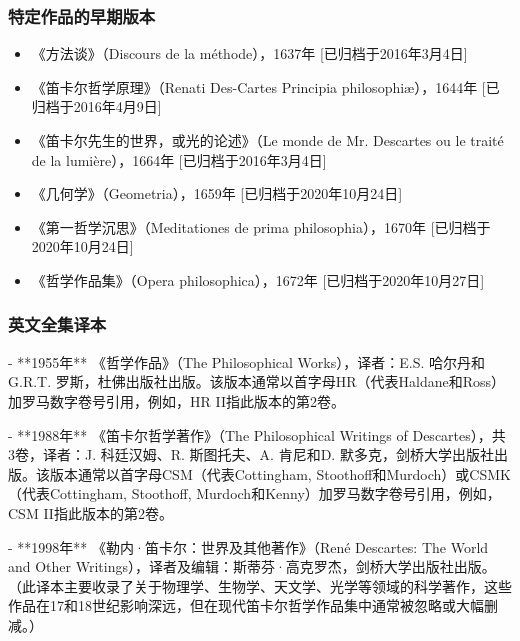\subsubsection{特定作品的早期版本}
\begin{itemize}
\item 《方法谈》（Discours de la méthode），1637年 [已归档于2016年3月4日]
\item 《笛卡尔哲学原理》（Renati Des-Cartes Principia philosophiæ），1644年 [已归档于2016年4月9日]
\item 《笛卡尔先生的世界，或光的论述》（Le monde de Mr. Descartes ou le traité de la lumière），1664年 [已归档于2016年3月4日]
\item 《几何学》（Geometria），1659年 [已归档于2020年10月24日]
\item 《第一哲学沉思》（Meditationes de prima philosophia），1670年 [已归档于2020年10月24日]
\item 《哲学作品集》（Opera philosophica），1672年 [已归档于2020年10月27日]
\end{itemize}
\subsubsection{英文全集译本}

- **1955年** 《哲学作品》（The Philosophical Works），译者：E.S. 哈尔丹和G.R.T. 罗斯，杜佛出版社出版。该版本通常以首字母HR（代表Haldane和Ross）加罗马数字卷号引用，例如，HR II指此版本的第2卷。

- **1988年** 《笛卡尔哲学著作》（The Philosophical Writings of Descartes），共3卷，译者：J. 科廷汉姆、R. 斯图托夫、A. 肯尼和D. 默多克，剑桥大学出版社出版。该版本通常以首字母CSM（代表Cottingham, Stoothoff和Murdoch）或CSMK（代表Cottingham, Stoothoff, Murdoch和Kenny）加罗马数字卷号引用，例如，CSM II指此版本的第2卷。

- **1998年** 《勒内·笛卡尔：世界及其他著作》（René Descartes: The World and Other Writings），译者及编辑：斯蒂芬·高克罗杰，剑桥大学出版社出版。（此译本主要收录了关于物理学、生物学、天文学、光学等领域的科学著作，这些作品在17和18世纪影响深远，但在现代笛卡尔哲学作品集中通常被忽略或大幅删减。）